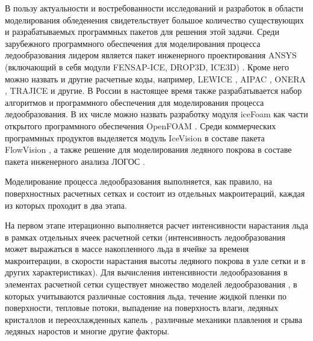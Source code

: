 В пользу актуальности и востребованности исследований и разработок в области моделирования обледенения свидетельствует большое количество существующих и разрабатываемых программных пакетов для решения этой задачи.
Среди зарубежного программного обеспечения для моделирования процесса ледообразования лидером является пакет инженерного проектирования ANSYS (включающий в себя модули FENSAP-ICE, DROP3D, ICE3D) \cite{Martini2022IntroIce}.
Кроме него можно назвать и другие расчетные коды, например, LEWICE \cite{Shannon2019IntroIce}, AIPAC \cite{Domingos2015IceHeat}, ONERA \cite{Villedieu2014IntroIce}, TRAJICE \cite{Son2010IntroIce} и другие.
В России в настоящее время также разрабатывается набор алгоритмов и программного обеспечения для моделирования процесса ледообразования.
В их числе можно назвать разработку модуля iceFoam как части открытого программного обеспечения OpenFOAM \cite{Koshelev2020Ice}.
Среди коммерческих программных продуктов выделяется модуль IceVision в составе пакета FlowVision \cite{Sorokin2020Ice}, а также решение для моделирования ледяного покрова в составе пакета инженерного анализа ЛОГОС \cite{Galanov2021IntroIce,Galanov2021IntoIceLOGOS}.

Моделирование процесса ледообразования выполняется, как правило, на поверхностных расчетных сетках и состоит из отдельных макроитераций, каждая из которых проходит в два этапа.

На первом этапе итерационно выполняется расчет интенсивности нарастания льда в рамках отдельных ячеек расчетной сетки (интенсивность ледообразования может выражаться в массе накопленного льда в ячейке за временя макроитерации, в скорости нарастания высоты ледяного покрова в узле сетки и в других характеристиках).
Для вычисления интенсивности ледообразования в элементах расчетной сетки существует множество моделей ледообразования \cite{Bartkus2018IntroIce,Zhang2017IntroIce,Pena2016IntroIce}, в которых учитываются различные состояния льда, течение жидкой пленки по поверхности, тепловые потоки, выпадение на поверхность влаги, ледяных кристаллов и переохлажденных капель \cite{Wang2023IntroIce,Liu2022IntroIce}, различные механики плавления и срыва ледяных наростов \cite{Ruan2023IntroIce} и многие другие факторы. 


